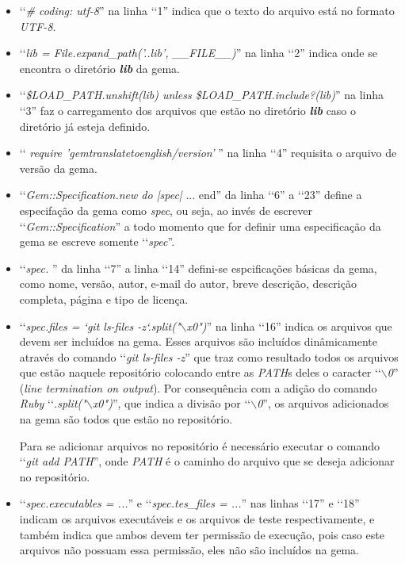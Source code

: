 \begin{itemize}

 \item ‘‘\emph{\# coding: utf-8}'' na linha ‘‘1'' indica que o texto do arquivo está no formato \emph{UTF-8}.
 
 \item ‘‘\emph{lib = File.expand\_path('..\/lib', \_\_FILE\_\_)}'' na linha ‘‘2'' indica onde se encontra o 
 diretório \emph{\textbf{lib}} da gema.
 
 \item ‘‘\emph{\$LOAD\_PATH.unshift(lib) unless \$LOAD\_PATH.include?(lib)}'' na linha ‘‘3'' faz o 
 carregamento dos arquivos que estão no diretório \emph{\textbf{lib}} caso o diretório já esteja definido.
 
 \item ‘‘ \emph{require 'gemtranslatetoenglish/version'} '' na linha ‘‘4'' requisita o arquivo de versão da
 gema.
 
 \item ‘‘\emph{Gem::Specification.new do |spec|} ... end'' da linha ‘‘6'' a ‘‘23'' define a especifação da
 gema como \emph{spec}, ou seja, ao invés de escrever ‘‘\emph{Gem::Specification}'' a todo momento que for 
 definir uma especificação da gema se escreve somente ‘‘\emph{spec}''.
 
 \item ‘‘\emph{spec. }'' da linha ‘‘7'' a linha ‘‘14'' defini-se espcificações básicas da gema, como nome,
 versão, autor, e-mail do autor, breve descrição, descrição completa, página e tipo de licença.
 
 \item ‘‘\emph{spec.files = `git ls-files -z`.split("$\backslash$x0")}'' na linha ‘‘16'' indica os arquivos
 que devem ser incluídos na gema. Esses arquivos são incluídos dinâmicamente através do comando 
 ‘‘\emph{git ls-files -z}'' que traz como resultado todos os arquivos que estão naquele repositório 
 colocando entre as \emph{PATH}s deles o caracter ‘‘\emph{$\backslash$0}'' 
 (\emph{line termination on output}). Por consequência com a adição do comando \emph{Ruby} 
 ‘‘\emph{.split("$\backslash$x0")}'', que indica a divisão por ‘‘\emph{$\backslash$0}'', os arquivos 
 adicionados na gema são todos que estão no repositório. 
 
 Para se adicionar arquivos no repositório é necessário executar o comando ‘‘\emph{git add PATH}'', 
 onde \emph{PATH} é o caminho do arquivo que se deseja adicionar no repositório.
 
 \item ‘‘\emph{spec.executables = ...}'' e ‘‘\emph{spec.tes\_files = ...}'' nas linhas ‘‘17'' e ‘‘18'' 
 indicam os arquivos executáveis e os arquivos de teste respectivamente, e também indica que ambos devem
 ter permissão de execução, pois caso este arquivos não possuam essa permissão, eles não são incluídos 
 na gema.
 

\end{itemize}
